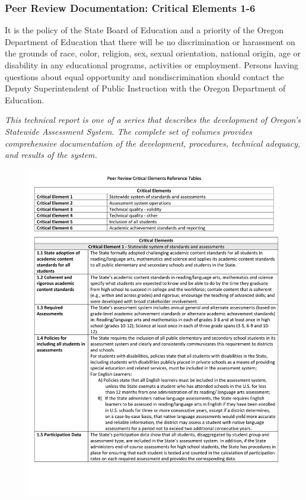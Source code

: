\documentclass[]{article}
\begin{document}
\subsubsection{Peer Review Documentation: Critical Elements
1-6}\label{peer-review-documentation-critical-elements-1-6-1}

It is the policy of the State Board of Education and a priority of the
Oregon Department of Education that there will be no discrimination or
harassment on the grounds of race, color, religion, sex, sexual
orientation, national origin, age or disability in any educational
programs, activities or employment. Persons having questions about equal
opportunity and nondiscrimination should contact the Deputy
Superintendent of Public Instruction with the Oregon Department of
Education.

\emph{This technical report is one of a series that describes the
development of Oregon's Statewide Assessment System. The complete set of
volumes provides comprehensive documentation of the development,
procedures, technical adequacy, and results of the system.}

\newpage

\begin{figure}
\centering
\includegraphics{Figures/peer_rev/PeerReview1.pdf}
\caption{}
\end{figure}
\end{document}
